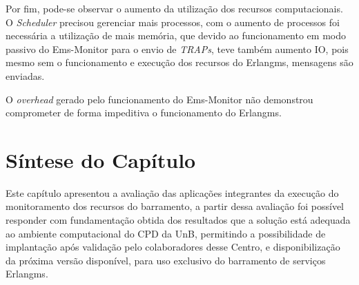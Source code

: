 Por fim, pode-se observar o aumento da utilização dos recursos computacionais. O \textit{Scheduler} precisou gerenciar mais processos, com o aumento de processos foi necessária a utilização de mais memória, que devido ao funcionamento em modo passivo do Ems-Monitor para o envio de \textit{TRAPs}, teve também aumento IO, pois mesmo sem o funcionamento e execução dos recursos do Erlangms, mensagens são enviadas. 

O \textit{overhead} gerado pelo funcionamento do Ems-Monitor não demonstrou comprometer de forma impeditiva o funcionamento do Erlangms.    
 

\section{Síntese do Capítulo}
\label{sintese5}

Este capítulo apresentou a avaliação das aplicações integrantes da execução do monitoramento dos recursos do barramento, a partir dessa avaliação foi possível responder com fundamentação obtida dos resultados que a solução está adequada ao ambiente computacional do \acrshort{CPD} da \acrshort{UnB}, permitindo a possibilidade de implantação após validação pelo colaboradores desse Centro, e disponibilização da próxima versão disponível, para uso exclusivo do barramento de serviços Erlangms.